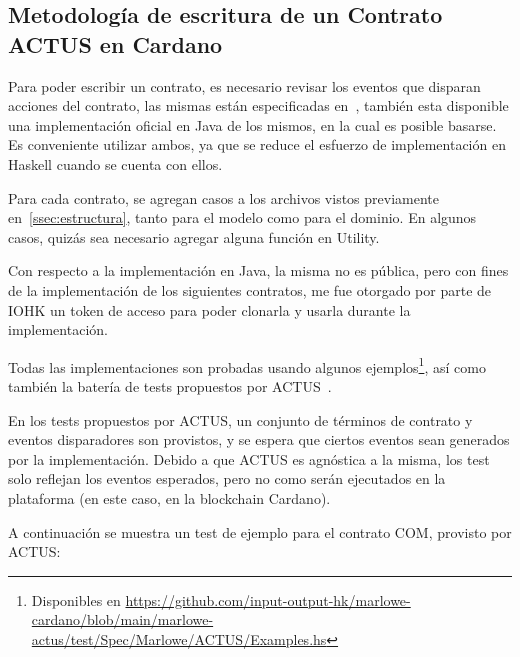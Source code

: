\documentclass[12pt]{book}
\begin{document}
\subsection{Metodología de escritura de un Contrato ACTUS en Cardano}

Para poder escribir un contrato, es necesario revisar los eventos que disparan acciones del contrato, las mismas están especificadas en~\cite{ACTUS_Techspecs}, también esta disponible una implementación oficial en Java de los mismos, en la cual es posible basarse. Es conveniente utilizar ambos, ya que se reduce el esfuerzo de implementación en Haskell cuando se cuenta con ellos.

Para cada contrato, se agregan casos a los archivos vistos previamente en~\ref{ssec:estructura}, tanto para el modelo como para el dominio. En algunos casos, quizás sea necesario agregar alguna función en Utility.

Con respecto a la implementación en Java, la misma no es pública, pero con fines de la implementación de los siguientes contratos, me fue otorgado por parte de IOHK un token de acceso para poder clonarla y usarla durante la implementación.

Todas las implementaciones son probadas usando algunos ejemplos\footnote{Disponibles en \url{https://github.com/input-output-hk/marlowe-cardano/blob/main/marlowe-actus/test/Spec/Marlowe/ACTUS/Examples.hs}}, así como también la batería de tests propuestos por ACTUS~\cite{ACTUS_Tests}.

En los tests propuestos por ACTUS, un conjunto de términos de contrato y eventos disparadores son provistos, y se espera que ciertos eventos sean generados por la implementación. Debido a que ACTUS es agnóstica a la misma, los test solo reflejan los eventos esperados, pero no como serán ejecutados en la plataforma (en este caso, en la blockchain Cardano).

A continuación se muestra un test de ejemplo para el contrato COM, provisto por ACTUS:\@
\end{document}
